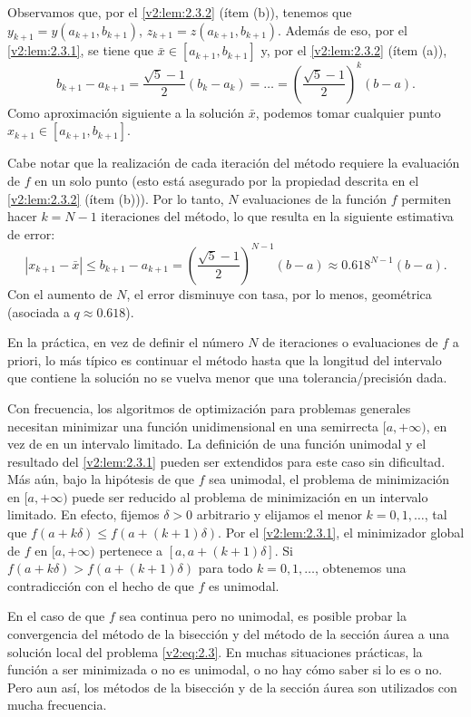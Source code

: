 Observamos que, por el \cref{v2:lem:2.3.2} (ítem (b)), tenemos que $y_{k+1} = y(a_{k+1}, b_{k+1})$, $z_{k+1} = z(a_{k+1}, b_{k+1})$. Además de eso, por el \cref{v2:lem:2.3.1}, se tiene que $\bar{x} \in [a_{k+1}, b_{k+1}]$ y, por el \cref{v2:lem:2.3.2} (ítem (a)),
\[
    b_{k+1} - a_{k+1} = \frac{\sqrt{5} - 1}{2}(b_k - a_k) = \dots = \left( \frac{\sqrt{5} - 1}{2} \right)^k (b - a).
\]
Como aproximación siguiente a la solución $\bar{x}$, podemos tomar cualquier punto $x_{k+1} \in [a_{k+1}, b_{k+1}]$.

Cabe notar que la realización de cada iteración del método requiere la evaluación de $f$ en un solo punto (esto está asegurado por la propiedad descrita en el \cref{v2:lem:2.3.2} (ítem (b))). Por lo tanto, $N$ evaluaciones de la función $f$ permiten hacer $k = N - 1$ iteraciones del método, lo que resulta en la siguiente estimativa de error:
\[
    |x_{k+1} - \bar{x}| \le b_{k+1} - a_{k+1} = \left( \frac{\sqrt{5} - 1}{2} \right)^{N-1} (b - a) \approx 0.618^{N-1}(b - a).
\]
Con el aumento de $N$, el error disminuye con tasa, por lo menos, geométrica (asociada a $q \approx 0.618$).

En la práctica, en vez de definir el número $N$ de iteraciones o evaluaciones de $f$ a priori, lo más típico es continuar el método hasta que la longitud del intervalo que contiene la solución no se vuelva menor que una tolerancia/precisión dada.

Con frecuencia, los algoritmos de optimización para problemas generales necesitan minimizar una función unidimensional en una semirrecta $[a, +\infty)$, en vez de en un intervalo limitado. La definición de una función unimodal y el resultado del \cref{v2:lem:2.3.1} pueden ser extendidos para este caso sin dificultad. Más aún, bajo la hipótesis de que $f$ sea unimodal, el problema de minimización en $[a, +\infty)$ puede ser reducido al problema de minimización en un intervalo limitado. En efecto, fijemos $\delta > 0$ arbitrario y elijamos el menor $k = 0, 1, \dots$, tal que $f(a + k\delta) \le f(a + (k+1)\delta)$. Por el \cref{v2:lem:2.3.1}, el minimizador global de $f$ en $[a, +\infty)$ pertenece a $[a, a + (k+1)\delta]$. Si $f(a + k\delta) > f(a + (k+1)\delta)$ para todo $k = 0, 1, \dots$, obtenemos una contradicción con el hecho de que $f$ es unimodal.

En el caso de que $f$ sea continua pero no unimodal, es posible probar la convergencia del método de la bisección y del método de la sección áurea a una solución local del problema \eqref{v2:eq:2.3}. En muchas situaciones prácticas, la función a ser minimizada o no es unimodal, o no hay cómo saber si lo es o no. Pero aun así, los métodos de la bisección y de la sección áurea son utilizados con mucha frecuencia.

